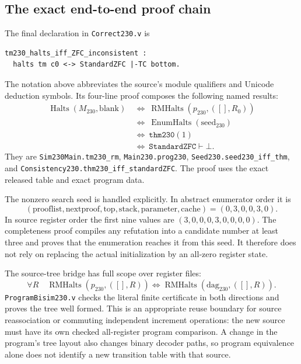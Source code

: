 \subsection{The exact end-to-end proof chain}

The final declaration in \texttt{Correct230.v} is
\begin{verbatim}
tm230_halts_iff_ZFC_inconsistent :
  halts tm c0 <-> StandardZFC |-TC bottom.
\end{verbatim}
The notation above abbreviates the source's module qualifiers and
Unicode deduction symbols.  Its four-line proof composes the following
named results:
\begin{align*}
 \operatorname{Halts}(M_{230},\mathrm{blank})
 &\ \Longleftrightarrow\
       \operatorname{RMHalts}(p_{230},([],R_0))\\
 &\ \Longleftrightarrow\
       \operatorname{EnumHalts}(\mathrm{seed}_{230})\\
 &\ \Longleftrightarrow\ \texttt{thm230}(1)\\
 &\ \Longleftrightarrow\
       \texttt{StandardZFC}\vdash\bot.
\end{align*}
They are \texttt{Sim230Main.tm230\_rm},
\texttt{Main230.prog230}, \texttt{Seed230.seed230\_iff\_thm},
and \texttt{Consistency230.thm230\_iff\_standardZFC}.
The proof uses the exact released table and exact program data.

The nonzero search seed is handled explicitly.  In abstract enumerator
order it is
\[
 (\mathrm{prooflist},\mathrm{nextproof},\mathrm{top},
     \mathrm{stack},\mathrm{parameter},\mathrm{cache})
                    =(0,3,0,0,3,0).
\]
In source register order the first nine values are
$(3,0,0,0,3,0,0,0,0)$.  The completeness proof compiles any
refutation into a candidate number at least three and proves that
the enumeration reaches it from this seed.  It therefore does
not rely on replacing the actual initialization by an all-zero
register state.

The source-tree bridge has full scope over register files:
\[
 \forall R\quad
 \operatorname{RMHalts}(p_{230},([],R))
       \Longleftrightarrow
 \operatorname{RMHalts}(\mathrm{dag}_{230},([],R)).
\]
\texttt{ProgramBisim230.v} checks the literal finite certificate in
both directions and proves the tree well formed.  This is an
appropriate reuse boundary for source reassociation or commuting
independent increment operations: the new source must have its own
checked all-register program comparison.  A change in the program's
tree layout also changes binary decoder paths, so program equivalence
alone does not identify a new transition table with that source.

